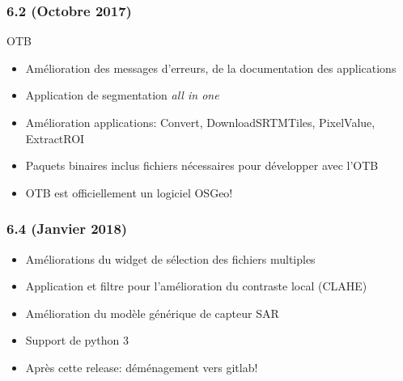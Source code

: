 \documentclass[8pt]{beamer}
\begin{document}
\begin{frame}
  \frametitle{6.2 (Octobre 2017)}
  \begin{block}{OTB}
    \begin{itemize}
      \item Amélioration des messages d'erreurs, de la documentation des applications
      \item Application de segmentation \textit{all in one}
      \item Amélioration applications: Convert, DownloadSRTMTiles, PixelValue, ExtractROI
      \item Paquets binaires inclus fichiers nécessaires pour développer avec l'OTB
      \item OTB est officiellement un logiciel OSGeo!
    \end{itemize}
    \end{block}
\end{frame}

\begin{frame}
  \frametitle{6.4 (Janvier 2018)}

  \begin{itemize}
  \item Améliorations du widget de sélection des fichiers multiples
  \item Application et filtre pour l'amélioration du contraste local (CLAHE)
  \item Amélioration du modèle générique de capteur SAR
  \item Support de python 3
  \item Après cette release: déménagement vers gitlab!
  \end{itemize}  
\end{frame}
\end{document}
